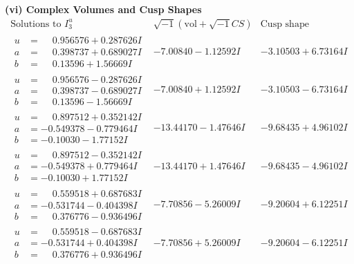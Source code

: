 \documentclass[1p]{elsarticle_modified}
\theoremstyle{definition}
\newcommand{\I}{\sqrt{-1}}
\begin{document}
\newpage\flushleft \textbf{(vi) Complex Volumes and Cusp Shapes}
$$\begin{array}{c|c|c}  
\text{Solutions to }I^u_{3}& \I (\text{vol} + \sqrt{-1}CS) & \text{Cusp shape}\\
 \hline 
\begin{aligned}
u &= \phantom{-}0.956576 + 0.287626 I \\
a &= \phantom{-}0.398737 + 0.689027 I \\
b &= \phantom{-}0.13596 + 1.56669 I\end{aligned}
 & -7.00840 - 1.12592 I & -3.10503 + 6.73164 I \\ \hline\begin{aligned}
u &= \phantom{-}0.956576 - 0.287626 I \\
a &= \phantom{-}0.398737 - 0.689027 I \\
b &= \phantom{-}0.13596 - 1.56669 I\end{aligned}
 & -7.00840 + 1.12592 I & -3.10503 - 6.73164 I \\ \hline\begin{aligned}
u &= \phantom{-}0.897512 + 0.352142 I \\
a &= -0.549378 - 0.779464 I \\
b &= -0.10030 - 1.77152 I\end{aligned}
 & -13.44170 - 1.47646 I & -9.68435 + 4.96102 I \\ \hline\begin{aligned}
u &= \phantom{-}0.897512 - 0.352142 I \\
a &= -0.549378 + 0.779464 I \\
b &= -0.10030 + 1.77152 I\end{aligned}
 & -13.44170 + 1.47646 I & -9.68435 - 4.96102 I \\ \hline\begin{aligned}
u &= \phantom{-}0.559518 + 0.687683 I \\
a &= -0.531744 - 0.404398 I \\
b &= \phantom{-}0.376776 - 0.936496 I\end{aligned}
 & -7.70856 - 5.26009 I & -9.20604 + 6.12251 I \\ \hline\begin{aligned}
u &= \phantom{-}0.559518 - 0.687683 I \\
a &= -0.531744 + 0.404398 I \\
b &= \phantom{-}0.376776 + 0.936496 I\end{aligned}
 & -7.70856 + 5.26009 I & -9.20604 - 6.12251 I \\ \hline\begin{aligned}

\end{aligned}
\end{array}$$
\end{document}
